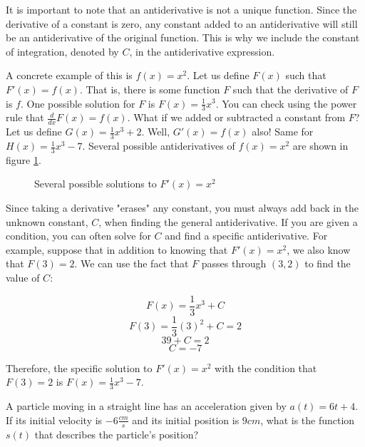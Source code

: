 It is important to note that an antiderivative is not a unique
function. Since the derivative of a constant is zero, any constant
added to an antiderivative will still be an antiderivative of the
original function. This is why we include the constant of integration,
denoted by $C$, in the antiderivative expression.

A concrete example of this is $f(x) = x^2$. Let us define $F(x)$ such that $F'(x) = f(x)$. That is, there is some function $F$ such that the derivative of $F$ is $f$. One possible solution for $F$ is $F(x) = \frac{1}{3}x^3$. You can check using the power rule that $\frac{d}{dx}F(x) = f(x)$. What if we added or subtracted a constant from $F$? Let us define $G(x) = \frac{1}{3}x^3+2$. Well, $G'(x) = f(x)$ also! Same for $H(x) = \frac{1}{3}x^3-7$. Several possible antiderivatives of $f(x) = x^2$ are shown in figure \ref{fig:antideriv}. 

\begin{figure}
	\centering
	\caption{Several possible solutions to $F'(x) = x^2$}
	\label{fig:antideriv}
\end{figure} 

Since taking a derivative "erases" any constant, you must always add back in the unknown constant, $C$, when finding the general antiderivative. If you are given a condition, you can often solve for $C$ and find a specific antiderivative. For example, suppose that in addition to knowing that $F'(x) = x^2$, we also know that $F(3) = 2$. We can use the fact that $F$ passes through $(3, 2)$ to find the value of $C$:

$$F(x) = \frac{1}{3}x^3+C$$
$$F(3) = \frac{1}{3}(3)^2+C = 2$$
$$39+C=2$$
$$C=-7$$

Therefore, the specific solution to $F'(x) = x^2$ with the condition that $F(3) =2$ is $F(x) = \frac{1}{3}x^3-7$. 

\begin{Exercise}[label=antideriv1]
	A particle moving in a straight line has an acceleration given by $a(t) = 6t+4$. If its initial velocity is $-6 \frac{cm}{s}$ and its initial position is $9 cm$, what is the function $s(t)$ that describes the particle's position?
\end{Exercise}

